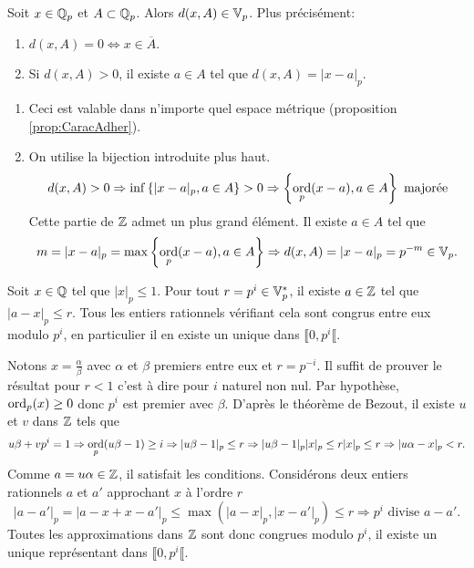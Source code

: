 \begin{prop}
 Soit $x \in \mathbb{Q}_p$ et $A \subset \mathbb{Q}_p$. Alors $d(x,A) \in \mathbb{V}_p$. Plus précisément:
 \begin{enumerate}
  \item $d(x,A)=0 \Leftrightarrow x \in \overline{A}$.
  \item Si $d(x,A) > 0$, il existe $a\in A$ tel que $d(x,A) = |x-a|_p$.
 \end{enumerate}
\end{prop}
\begin{demo}
\begin{enumerate}
 \item Ceci est valable dans n'importe quel espace métrique (proposition \ref{prop:CaracAdher}).
 \item On utilise la bijection introduite plus haut.
 \begin{displaymath}
  d(x,A) > 0 \Rightarrow \inf \left\lbrace |x-a|_p, a\in A\right\rbrace > 0
    \Rightarrow \left\lbrace \mathop{\mathrm{ord}}_p(x-a), a\in A\right\rbrace \text{ majorée}
 \end{displaymath}
 Cette partie de $\mathbb{Z}$ admet un plus grand élément. Il existe $a\in A$ tel que
 \begin{displaymath}
  m = |x-a|_p = \max \left\lbrace \mathop{\mathrm{ord}}_p(x-a), a\in A\right\rbrace \Rightarrow d(x,A) = |x-a|_p = p^{-m} \in \mathbb{V}_p.
 \end{displaymath}
\end{enumerate}
\end{demo}

\begin{propn}\label{prop:ReprésentEntierNbPadiq}
Soit $x\in \mathbb{Q}$ tel que $|x|_p \leq 1$. Pour tout $r=p^i\in \mathbb{V}_p^*$, il existe $a \in \mathbb{Z}$ tel que $|a-x|_p \leq r$. Tous les entiers rationnels vérifiant cela sont congrus entre eux modulo $p^i$, en particulier il en existe un unique dans $\llbracket 0, p^i \llbracket$.
\end{propn}
\begin{demo}
 Notons $x=\frac{\alpha}{\beta}$ avec $\alpha$ et $\beta$ premiers entre eux et $r=p^{-i}$. Il suffit de prouver le résultat pour $r<1$ c'est à dire pour $i$ naturel non nul.\newline
 Par hypothèse, $\mathop{\mathrm{ord}}_p(x)\geq 0$ donc $p^i$ est premier avec $\beta$. D'après le théorème de Bezout, il existe $u$ et $v$ dans $\mathbb{Z}$ tels que
\begin{displaymath}
 u\beta + vp^i = 1 \Rightarrow \mathop{\mathrm{ord}}_p(u\beta - 1) \geq i \Rightarrow |u\beta - 1|_p \leq r
 \Rightarrow |u\beta - 1|_p |x|_p \leq r |x|_p \leq r
 \Rightarrow |u\alpha - x|_p < r.
\end{displaymath}
Comme $a = u\alpha \in \mathbb{Z}$, il satisfait les conditions.\newline
Considérons deux entiers rationnels $a$ et $a'$ approchant $x$ à l'ordre $r$
\begin{displaymath}
 |a-a'|_p = |a-x + x-a'|_p \leq \max(|a-x|_p, |x-a'|_p) \leq r
 \Rightarrow p^i \text{ divise } a-a'.
\end{displaymath}
Toutes les approximations dans $\mathbb{Z}$ sont donc congrues modulo $p^i$, il existe un unique représentant dans $\llbracket 0, p^i \llbracket$.
\end{demo}

